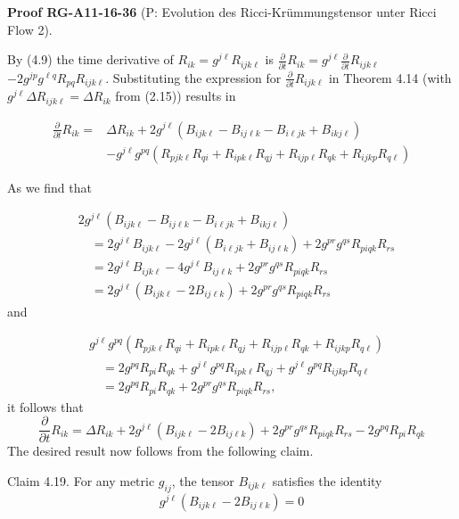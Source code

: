 \documentclass[10pt, letterpaper]{article}
\newcommand{\CustomHeading}[3]{%
  \par\medskip\noindent%
  \textbf{#1 #2} \textnormal{(#3)}.\enskip%
}
\newenvironment{PROOF}[2]{\CustomHeading{Proof}{#1}{#2}}{}
\begin{document}
\begin{PROOF}{RG-A11-16-36}{P: Evolution des Ricci-Krümmungstensor unter Ricci Flow 2}
By (4.9) the time derivative of $R_{i k}=g^{j \ell} R_{i j k \ell}$ is $\frac{\partial}{\partial t} R_{i k}=g^{j \ell} \frac{\partial}{\partial t} R_{i j k \ell}$ $-2 g^{j p} g^{\ell q} R_{p q} R_{i j k \ell}$. Substituting the expression for $\frac{\partial}{\partial t} R_{i j k \ell}$ in Theorem 4.14 (with $g^{j \ell} \Delta R_{i j k \ell}=\Delta R_{i k}$ from (2.15)) results in

$$\begin{aligned}
\frac{\partial}{\partial t} R_{i k}= & \Delta R_{i k}+2 g^{j \ell}\left(B_{i j k \ell}-B_{i j \ell k}-B_{i \ell j k}+B_{i k j \ell}\right) \\
& -g^{j \ell} g^{p q}\left(R_{p j k \ell} R_{q i}+R_{i p k \ell} R_{q j}+R_{i j p \ell} R_{q k}+R_{i j k p} R_{q \ell}\right)
\end{aligned}$$

As we find that

$$\begin{aligned}
& 2 g^{j \ell}\left(B_{i j k \ell}-B_{i j \ell k}-B_{i \ell j k}+B_{i k j \ell}\right) \\
& \quad=2 g^{j \ell} B_{i j k \ell}-2 g^{j \ell}\left(B_{i \ell j k}+B_{i j \ell k}\right)+2 g^{p r} g^{q s} R_{p i q k} R_{r s} \\
& \quad=2 g^{j \ell} B_{i j k \ell}-4 g^{j \ell} B_{i j \ell k}+2 g^{p r} g^{q s} R_{p i q k} R_{r s} \\
& \quad=2 g^{j \ell}\left(B_{i j k \ell}-2 B_{i j \ell k}\right)+2 g^{p r} g^{q s} R_{p i q k} R_{r s}
\end{aligned}$$
and

$$\begin{aligned}
& g^{j \ell} g^{p q}\left(R_{p j k \ell} R_{q i}+R_{i p k \ell} R_{q j}+R_{i j p \ell} R_{q k}+R_{i j k p} R_{q \ell}\right) \\
& \quad=2 g^{p q} R_{p i} R_{q k}+g^{j \ell} g^{p q} R_{i p k \ell} R_{q j}+g^{j \ell} g^{p q} R_{i j k p} R_{q \ell} \\
& \quad=2 g^{p q} R_{p i} R_{q k}+2 g^{p r} g^{q s} R_{p i q k} R_{r s},
\end{aligned}$$
it follows that
$$\frac{\partial}{\partial t} R_{i k}=\Delta R_{i k}+2 g^{j \ell}\left(B_{i j k \ell}-2 B_{i j \ell k}\right)+2 g^{p r} g^{q s} R_{p i q k} R_{r s}-2 g^{p q} R_{p i} R_{q k}$$
The desired result now follows from the following claim.

Claim 4.19. For any metric $g_{i j}$, the tensor $B_{i j k \ell}$ satisfies the identity
$$g^{j \ell}\left(B_{i j k \ell}-2 B_{i j \ell k}\right)=0$$


\end{PROOF}
\end{document}
